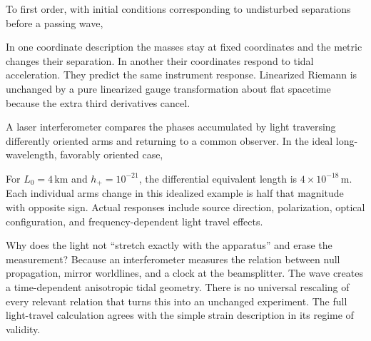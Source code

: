 \documentclass[
  11pt,
  letterpaper,
  oneside,
  openany]{scrbook}
\begin{document}
\begin{center}
\begingroup
{}
\ifdim\wd\grmathbox>\linewidth
\resizebox{\linewidth}{!}{\usebox{\grmathbox}}
\else\usebox{\grmathbox}\fi
\endgroup
\end{center}

To first order, with initial conditions corresponding to undisturbed
separations before a passing wave,

\begin{center}
\begingroup
{}
\ifdim\wd\grmathbox>\linewidth
\resizebox{\linewidth}{!}{\usebox{\grmathbox}}
\else\usebox{\grmathbox}\fi
\endgroup
\end{center}

In one coordinate description the masses stay at fixed coordinates and
the metric changes their separation. In another their coordinates
respond to tidal acceleration. They predict the same instrument
response. Linearized Riemann is unchanged by a pure linearized gauge
transformation about flat spacetime because the extra third derivatives
cancel.

A laser interferometer compares the phases accumulated by light
traversing differently oriented arms and returning to a common observer.
In the ideal long-wavelength, favorably oriented case,

\begin{center}
\begingroup
{}
\ifdim\wd\grmathbox>\linewidth
\resizebox{\linewidth}{!}{\usebox{\grmathbox}}
\else\usebox{\grmathbox}\fi
\endgroup
\end{center}

For \(L_0=4\,\mathrm{km}\) and \(h_+=10^{-21}\), the differential
equivalent length is \(4\times10^{-18}\,\mathrm m\). Each individual
arm\textquotesingle s change in this idealized example is half that
magnitude with opposite sign. Actual responses include source direction,
polarization, optical configuration, and frequency-dependent light
travel effects.

Why does the light not ``stretch exactly with the apparatus'' and erase
the measurement? Because an interferometer measures the relation between
null propagation, mirror worldlines, and a clock at the beamsplitter.
The wave creates a time-dependent anisotropic tidal geometry. There is
no universal rescaling of every relevant relation that turns this into
an unchanged experiment. The full light-travel calculation agrees with
the simple strain description in its regime of validity.
\end{document}
